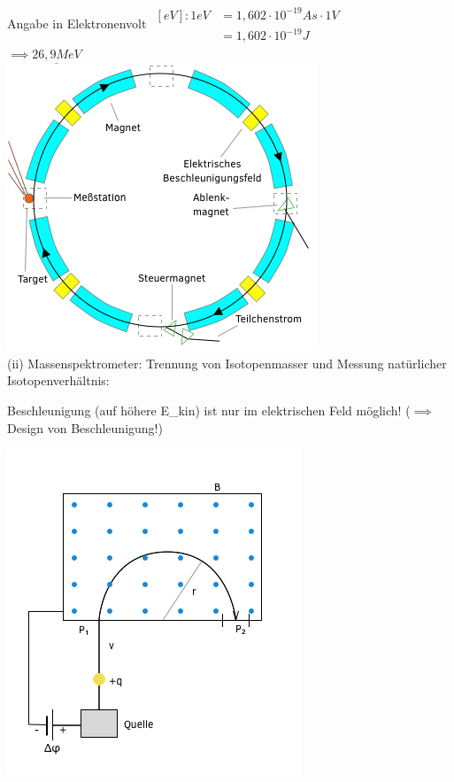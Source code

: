   Angabe in Elektronenvolt $\begin{align}
  	[eV]:1eV&= 1,602\cdot 10^{-19}As \cdot 1V\\
  	&=1,602\cdot 10^{-19}J
  \end{align}$\\
  
  $\implies \underline{26,9MeV}$\\
  
  \includegraphics{skizzen/16/16_1B04}\\
  
  (ii) Massenspektrometer: Trennung von Isotopenmasser und Messung natürlicher Isotopenverhältnis:
  
  Beschleunigung (auf höhere E_{kin}) ist nur im elektrischen Feld möglich! ($\implies$ Design von Beschleunigung!)
  
  \includegraphics{skizzen/16/16_1B05}\\
  
